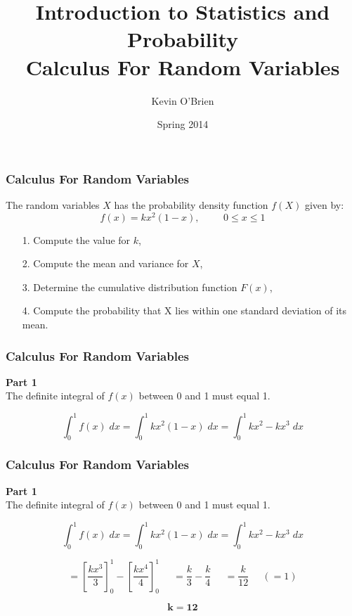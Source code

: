 \documentclass[a4]{beamer}
\title[Stats-Lab.com]{\LARGE Introduction to Statistics and Probability \\ {\Large Calculus For Random Variables}}
\author[Kevin O'Brien]{Kevin O'Brien}
\date{Spring 2014}
\begin{document}
\begin{frame}
\titlepage
\end{frame}
\begin{frame}
\frametitle{Calculus For Random Variables}
\Large

The random variables $X$ has the probability density function $f(X)$ given by:
\[ f(x) = kx^2(1-x), \phantom{space} 0 \leq x \leq 1 \]

\begin{itemize}
\item[1.] Compute the value for $k$,
\item[2.] Compute the mean and variance for $X$,
\item[3.] Determine the cumulative distribution function $F(x)$,
\item[4.] Compute the probability that X lies within one standard deviation of its mean.
\end{itemize}
\end{frame}
\begin{frame}
\frametitle{Calculus For Random Variables}
\Large
\vspace{-2.8cm}
\textbf{Part 1}\\
The definite integral of $f(x)$ between 0 and 1 must equal 1.

\[ \int^1_0 f(x)\;dx = \int^1_0 kx^2(1-x)\;dx = \int^1_0 kx^2-kx^3\;dx  \]
\end{frame}

\begin{frame}
\frametitle{Calculus For Random Variables}
\Large
\vspace{-0.5cm}
\textbf{Part 1}\\
The definite integral of $f(x)$ between 0 and 1 must equal 1.

\[ \int^1_0 f(x)\;dx = \int^1_0 kx^2(1-x)\;dx = \int^1_0 kx^2-kx^3\;dx  \]

\[ = \left[\frac{kx^3}{3} \right]^1_0  - \left[\frac{kx^4}{4} \right]^1_0
\phantom{sce} = \frac{k}{3} - \frac{k}{4} \phantom{sce} = \frac{k}{12} \phantom{sce}(= 1)
\] 

\[ \boldsymbol{k = 12}\]
\end{frame}
\end{document}
